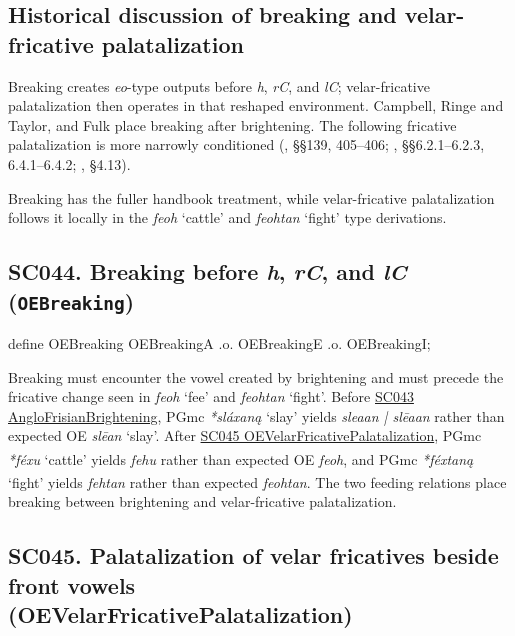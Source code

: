 \documentclass[
  british,
  a4paper,
  openany]{book}
\providecommand{\Pred}[1]{\textsuperscript{\dag}\emph{#1}}
\providecommand{\Recon}[1]{\emph{*#1}}
{\catcode`→=\active \global\def→{\ensuremath{\rightarrow}}}
\providecommand{\texorpdfstring}[2]{#1}
\DeclareRobustCommand{\CAPRRuleHeading}[2]{%
  #1\texorpdfstring{\\(#2)}{ (#2)}%
}
\providecommand{\Pred}[1]{\textsuperscript{\dag}\emph{#1}}
\providecommand{\Recon}[1]{\emph{*#1}}
{\catcode`→=\active \global\def→{\ensuremath{\rightarrow}}}
\begin{document}
\subsection{Historical discussion of breaking and velar-fricative
palatalization}\label{historical-discussion-of-breaking-and-velar-fricative-palatalization}

Breaking creates \emph{eo}-type outputs before \emph{h}, \emph{rC}, and
\emph{lC}; velar-fricative palatalization then operates in that reshaped
environment. Campbell, Ringe and Taylor, and Fulk place breaking after
brightening. The following fricative palatalization is more narrowly
conditioned (, §§139,
405--406; , §§6.2.1--6.2.3, 6.4.1--6.4.2; , §4.13).

Breaking has the fuller handbook treatment, while velar-fricative
palatalization follows it locally in the \emph{feoh} `cattle' and
\emph{feohtan} `fight' type derivations.

\subsection{\texorpdfstring{SC044. Breaking before \emph{h}, \emph{rC},
and \emph{lC}
(\texttt{OEBreaking})}{SC044. Breaking before , , and  (OEBreaking)}}\label{rule-OEBreaking}

\begin{ReaderFacingFoma}
define OEBreaking OEBreakingA
    .o. OEBreakingE
    .o. OEBreakingI;
\end{ReaderFacingFoma}

Breaking must encounter the vowel created by brightening and must
precede the fricative change seen in \emph{feoh} `fee' and
\emph{feohtan} `fight'. Before
\hyperref[rule-AngloFrisianBrightening]{SC043 AngloFrisianBrightening},
PGmc \Recon{sláxaną} `slay' yields \emph{sleaan | slēaan} rather than
expected OE \emph{slēan} `slay'. After
\hyperref[rule-OEVelarFricativePalatalization]{SC045
OEVelarFricativePalatalization}, PGmc \Recon{féxu} `cattle' yields
\Pred{fehu} rather than expected OE \emph{feoh}, and PGmc
\Recon{féxtaną} `fight' yields \Pred{fehtan} rather than expected
\emph{feohtan}. The two feeding relations place breaking between
brightening and velar-fricative palatalization.

\subsection{\texorpdfstring{\CAPRRuleHeading{SC045. Palatalization of velar fricatives beside front vowels}{OEVelarFricativePalatalization}}{}}\label{rule-OEVelarFricativePalatalization}
\end{document}
